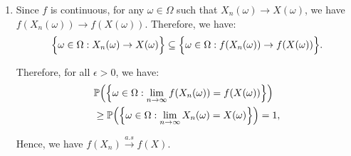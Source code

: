 \begin{proof*}
\begin{enumerate}
        \item Since $f$ is continuous, for any $\omega\in\Omega$ such that $X_n(\omega)\to X(\omega)$, we have $f(X_n(\omega))\to f(X(\omega))$. Therefore, we have:
        \begin{align*}
            \Big\{ \omega\in\Omega : X_n(\omega)\to X(\omega) \Big\}\subseteq\Big\{ \omega\in\Omega:f(X_n(\omega))\to f(X(\omega)) \Big\}.
        \end{align*}

        \noindent Therefore, for all $\epsilon>0$, we have:
        \begin{align*}
            &\mathbb{P}\Big( \Big\{ \omega\in\Omega:\lim_{n\to\infty} f(X_n(\omega)) = f(X(\omega)) \Big\} \Big) \\
            &\ge \mathbb{P}\Big( \Big\{ \omega\in\Omega:\lim_{n\to\infty} X_n(\omega) = X(\omega) \Big\} \Big) = 1,
        \end{align*}

        \noindent Hence, we have $f(X_n)\xrightarrow{a.s}f(X)$.
    \end{enumerate}
\end{proof*}
